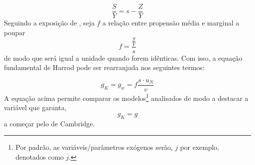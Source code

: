 \begin{equation}
\label{Poupanca_Super}
    \frac{S}{Y} = s - \frac{Z}{Y}
\end{equation}
Seguindo a exposição de \textcite{serrano_sraffian_1995}, seja $f$ a relação entre propensão média e marginal a poupar
$$
f = \frac{\frac{S}{Y}}{s}
$$
de modo que será igual a unidade quando forem idênticas. 
Com isso, a equação fundamental de Harrod pode ser rearranjada nos seguintes termos:

\begin{equation}
 \label{EqGeral}   
g_K = g_w = f\frac{s\cdot u_N}{v}
\end{equation}
A equação acima permite comparar os modelos\footnote{Por padrão, as variáveis/parâmetros exógenos serão, $j$ por exemplo, denotados como $\overline j$.} analisados de modo a destacar a variável que garanta, 
$$
g_K = g
$$
a começar pelo de Cambridge.
